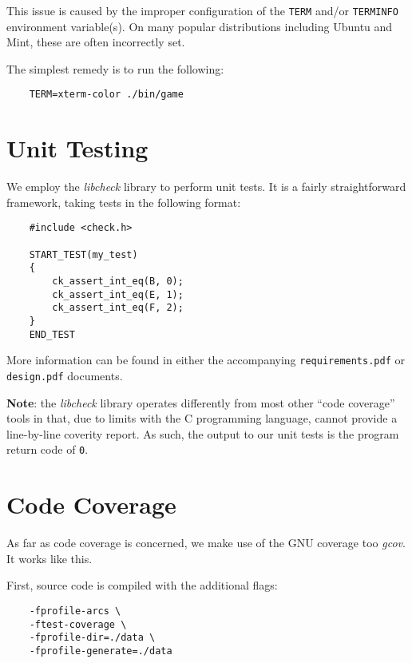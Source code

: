 \documentclass[letterpaper]{article}
\begin{document}
This issue is caused by the improper configuration of the
\texttt{TERM} and/or \texttt{TERMINFO} environment variable(s).
On many popular distributions including Ubuntu and Mint, these
are often incorrectly set.

The simplest remedy is to run the following:

\begin{lstlisting}
    TERM=xterm-color ./bin/game
\end{lstlisting}


\section{Unit Testing}

We employ the \emph{libcheck} library to perform unit tests. It
is a fairly straightforward framework, taking tests in the
following format:

\lstset{frame=tb}
\begin{lstlisting}
    #include <check.h>
    
    START_TEST(my_test)
    {
	    ck_assert_int_eq(B, 0);
	    ck_assert_int_eq(E, 1);
	    ck_assert_int_eq(F, 2);
    }
    END_TEST
\end{lstlisting}

More information can be found in either the accompanying
\texttt{requirements.pdf} or \texttt{design.pdf} documents.

\textbf{Note}: the \emph{libcheck} library operates differently
from most other ``code coverage'' tools in that, due to limits
with the C programming language, cannot provide a line-by-line
coverity report. As such, the output to our unit tests is the
program return code of \texttt{0}.


\section{Code Coverage}

As far as code coverage is concerned, we make use of the GNU
coverage too \emph{gcov}. It works like this.

First, source code is compiled with the additional flags:

\lstset{frame=none}
\begin{lstlisting}
    -fprofile-arcs \
    -ftest-coverage \
    -fprofile-dir=./data \
    -fprofile-generate=./data
\end{lstlisting}
\end{document}
